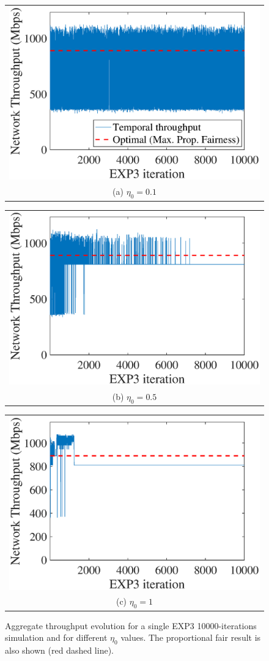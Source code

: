 \documentclass[preprint,12pt]{elsarticle}
\begin{document}
\begin{figure}
	\centering
	\begin{tabular}{@{}c@{}}
		\includegraphics[width=.3\textwidth]{images/NEW_temporal_aggregate_tpt_EXP3_eta01} \\[\abovecaptionskip]
		\small (a) $\eta_0 = 0.1$
		\label{fig:exp3_eta01_agg_tpt}
	\end{tabular}	
	\hspace{\floatsep}	
	\begin{tabular}{@{}c@{}}
		\includegraphics[width=.3\textwidth]{images/NEW_temporal_aggregate_tpt_EXP3_eta05} \\[\abovecaptionskip]
		\small (b) $\eta_0 = 0.5$
		\label{fig:exp3_eta05_agg_tpt}
	\end{tabular}
	\hspace{\floatsep}
	\begin{tabular}{@{}c@{}}
		\includegraphics[width=.3\textwidth]{images/NEW_temporal_aggregate_tpt_EXP3_eta1} \\[\abovecaptionskip]
		\small (c) $\eta_0 = 1$
		\label{fig:exp3_eta1_agg_tpt}
	\end{tabular}
	\caption{Aggregate throughput evolution for a single EXP3 10000-iterations simulation and for different $\eta_0$ values. The proportional fair result is also shown (red dashed line).}
	\label{fig:exp3_agg_tpt}
\end{figure}
\end{document}
